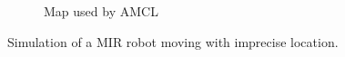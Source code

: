 \begin{figure}
\begin{subfigure}[b]{0.45\textwidth}
		\caption{Map used by AMCL}
		\label{fig:simulated_robot_estimate_total_edited}
	\end{subfigure}
	\caption{Simulation of a MIR robot moving with imprecise location.}
	\label{fig:animals}
\end{figure}

